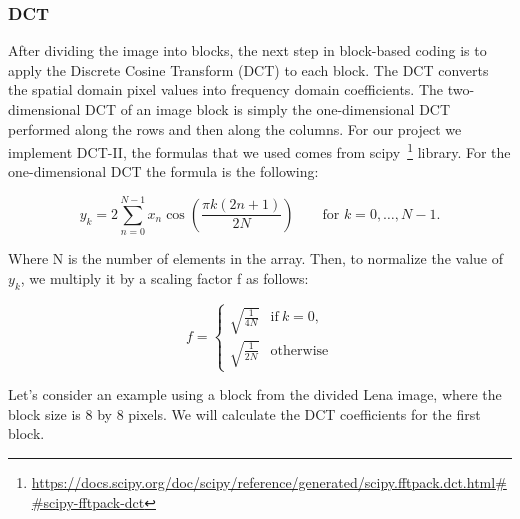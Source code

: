 \documentclass{article}
\begin{document}
\subsubsection{DCT}

After dividing the image into blocks, the next step in block-based coding is to apply the Discrete Cosine Transform (DCT) to each block. The DCT converts the spatial domain pixel values into frequency domain coefficients. The two-dimensional DCT of an image block is simply the one-dimensional DCT performed along the rows and then along the columns. For our project we implement DCT-II, the formulas that we used comes from scipy~\footnote{\url{https://docs.scipy.org/doc/scipy/reference/generated/scipy.fftpack.dct.html##scipy-fftpack-dct}} library.
For the one-dimensional DCT the formula is the following:  

\[
y_k = 2 \sum\limits_{n=0}^{N-1} x_n \cos\left(\frac{\pi k(2n+1)}{2N}\right) \qquad \text{for } k=0,\dots,N-1.
\]

Where N is the number of elements in the array. Then, to normalize the value of $y_k$, we multiply it by a scaling factor f as follows:

\[
f = \left\{
\begin{array}{ll}
\sqrt{\frac{1}{4N}} & \text{if}\ k = 0, \\
\sqrt{\frac{1}{2N}} & \text{otherwise}
\end{array}
\right.
\]

Let's consider an example using a block from the divided Lena image, where the block size is 8 by 8 pixels. We will calculate the DCT coefficients for the first block.
\end{document}
